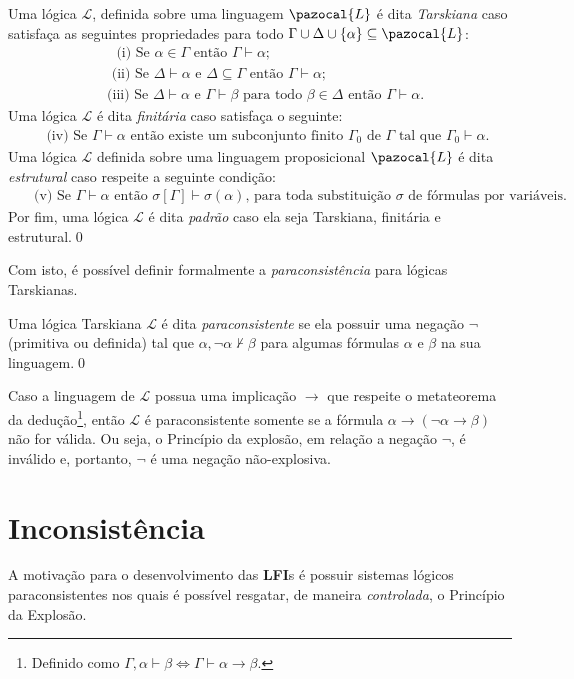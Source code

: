    \begin{definicao}
        Uma lógica $\mathcal{L}$, definida sobre uma linguagem $\pazocal{L}$ é dita \textit{Tarskiana} caso satisfaça as seguintes propriedades para todo $\Gamma \cup \Delta \cup \{\alpha\} \subseteq \pazocal{L}$:
        \begin{align*}
            &\text{~~(i) Se } \alpha \in \Gamma \text{ então } \Gamma \vdash \alpha;\\
            &\text{~(ii) Se } \Delta \vdash \alpha \text{ e } \Delta \subseteq \Gamma \text{ então } \Gamma \vdash \alpha;\\
            &\text{(iii) Se } \Delta \vdash \alpha \text{ e } \Gamma \vdash \beta \text{ para todo } \beta \in \Delta \text{ então } \Gamma \vdash \alpha.
        \end{align*}
        Uma lógica $\mathcal{L}$ é dita \textit{finitária} caso satisfaça o seguinte:
        \begin{align*}
            &\text{~(iv) Se } \Gamma \vdash \alpha \text{ então existe um subconjunto finito } \Gamma_{0} \text{ de } \Gamma \text{ tal que } \Gamma_{0} \vdash \alpha.
        \end{align*}
        Uma lógica $\mathcal{L}$ definida sobre uma linguagem proposicional $\pazocal{L}$ é dita \textit{estrutural} caso respeite a seguinte condição:
        \begin{align*}
            &\text{~~(v) Se } \Gamma \vdash \alpha \text{ então } \sigma [\Gamma] \vdash \sigma(\alpha) \text{, para toda substituição } \sigma \text{ de fórmulas por variáveis.}
        \end{align*}
        Por fim, uma lógica $\mathcal{L}$ é dita \textit{padrão} caso ela seja Tarskiana, finitária e estrutural.\qed
    \end{definicao}
    Com isto, é possível definir formalmente a \textit{paraconsistência} para lógicas Tarskianas.
    
    \begin{definicao}
        Uma lógica Tarskiana $\mathcal{L}$ é dita \textit{paraconsistente} se ela possuir uma negação $\neg$ (primitiva ou definida) tal que $\alpha, \neg \alpha \nvdash \beta$ para algumas fórmulas $\alpha$ e $\beta$ na sua linguagem.\qed{}
    \end{definicao}

    Caso a linguagem de $\mathcal{L}$ possua uma implicação $\rightarrow$ que respeite o metateorema da dedução\footnote{Definido como $\Gamma, \alpha \vdash \beta \Longleftrightarrow \Gamma\vdash \alpha \rightarrow \beta$.}, então $\mathcal{L}$ é paraconsistente somente se a fórmula $\alpha \rightarrow (\neg \alpha \rightarrow \beta)$ não for válida. Ou seja, o Princípio da explosão, em relação a negação $\neg$, é inválido e, portanto, $\neg$ é uma negação não-explosiva.

    \section{Inconsistência}
    A motivação para o desenvolvimento das \textbf{LFI}s é possuir sistemas lógicos paraconsistentes nos quais é possível resgatar, de maneira \textit{controlada}, o Princípio da Explosão.


